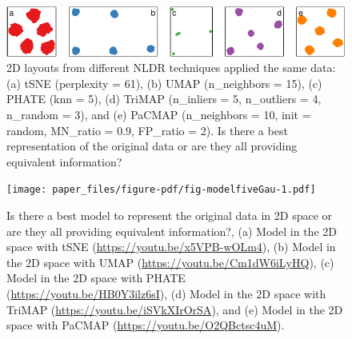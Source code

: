 \documentclass[
  12pt]{article}
\begin{document}
\begin{figure}

{\centering \includegraphics[width=1\textwidth,height=\textheight]{paper_files/figure-pdf/fig-nldervis5Gau-1.pdf}

}

\caption{\label{fig-nldervis5Gau}2D layouts from different NLDR
techniques applied the same data: (a) tSNE (perplexity = 61), (b) UMAP
(n\_neighbors = 15), (c) PHATE (knn = 5), (d) TriMAP (n\_inliers = 5,
n\_outliers = 4, n\_random = 3), and (e) PaCMAP (n\_neighbors = 10, init
= random, MN\_ratio = 0.9, FP\_ratio = 2). Is there a best
representation of the original data or are they all providing equivalent
information?}

\end{figure}

\begin{figure}

{\centering \texttt{[image: paper\_files/figure-pdf/fig-modelfiveGau-1.pdf]}

}

\caption{\label{fig-modelfiveGau}Is there a best model to represent the
original data in 2D space or are they all providing equivalent
information?, (a) Model in the 2D space with tSNE
(\url{https://youtu.be/x5VPB-wOLm4}), (b) Model in the 2D space with
UMAP (\url{https://youtu.be/Cm1dW6iLyHQ}), (c) Model in the 2D space
with PHATE (\url{https://youtu.be/HB0Y3ilz6sI}), (d) Model in the 2D
space with TriMAP (\url{https://youtu.be/iSVkXIrOrSA}), and (e) Model in
the 2D space with PaCMAP (\url{https://youtu.be/O2QBctsc4uM}).}

\end{figure}
\end{document}
